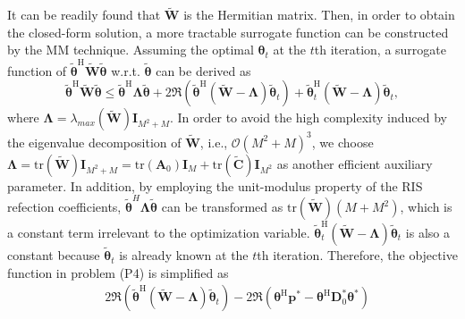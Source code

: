 \documentclass[journal]{IEEEtran}
\begin{document}
{It can be readily found that $\tilde{ \mathbf {W}}$ is the Hermitian matrix. Then, in order to obtain the closed-form solution, a more tractable surrogate function can be constructed by the MM technique. 
Assuming the optimal $\boldsymbol{\theta}_{t}$ at the $t$th iteration, a surrogate function of $\tilde{ \boldsymbol {\theta}}^{\mathrm{H}} \tilde{ \mathbf {W}} \tilde { \boldsymbol {\theta}}$ w.r.t. $\tilde{\boldsymbol {\theta}}$
can be derived as \cite{7547360}
\begin{equation}\!\! \tilde{ \boldsymbol {\theta}}^{\mathrm{H}} \!\tilde{ \mathbf {W}}\! \tilde { \boldsymbol {\theta}}\!\leq \!\tilde{\boldsymbol {\theta}}^{\mathrm{H}}\!{\boldsymbol {\Lambda}}\tilde{\boldsymbol {\theta}}\!+\!2{\Re}\left(\tilde{\boldsymbol {\theta}}^{\mathrm{H}}\left(\tilde{ \mathbf {W}}\! -\!{\boldsymbol {\Lambda}}\right)\tilde{\boldsymbol {\theta}}_{t}\right)\!\!+\!\tilde{\boldsymbol {\theta}}_{t}^{\mathrm{H}}\left(\tilde{ \mathbf {W}} \!\!-\!\!{\boldsymbol {\Lambda}}\right){\tilde{\boldsymbol {\theta}}}_{t},\end{equation}
where $\boldsymbol {\Lambda}= {\lambda}_{ {max}}(\tilde{ \mathbf {W}}){\mathbf{I}}_{{M}^{2}+{M}}$. In order to avoid the high complexity induced by the eigenvalue decomposition of $\tilde{ \mathbf {W}}$, i.e., $\mathcal {O}({M}^{2}+{M})^{3}$, we choose $\boldsymbol {\Lambda}={\mathrm {tr}}(\tilde{ \mathbf {W}}){\mathbf{I}}_{{M}^{2}+{M}}={\mathrm {tr}}(\mathbf{A}_{0}){\mathbf{I}}_{{M}}+{\mathrm {tr}}(\tilde{\mathbf{C}}){\mathbf{I}}_{{M}^{2}}$ as another efficient auxiliary parameter. In addition, by employing the unit-modulus property of the RIS refection coefficients,  $\tilde{\boldsymbol {\theta}}^{H}{\boldsymbol {\Lambda}}\tilde{\boldsymbol {\theta}}$ can be transformed as ${\mathrm {tr}}(\tilde{ \mathbf {W}})({M}+{M}^{2})$, which is a constant term irrelevant to the optimization variable.  
 $\tilde{\boldsymbol {\theta}}_{t}^{\mathrm{H}}\left(\tilde{ \mathbf {W}} -{\boldsymbol {\Lambda}}\right){\tilde{\boldsymbol {\theta}}}_{t}$ is also a constant because ${\tilde{\boldsymbol {\theta}}}_{t}$ is already known at the ${t}$th iteration.
Therefore, the objective function in problem (P4) is simplified as 
\begin{equation}\begin{aligned}&
2{\Re}\left(\tilde{\boldsymbol {\theta}}^{\mathrm{H}}\left(\tilde{ \mathbf {W}} -{\boldsymbol {\Lambda}}\right)\tilde{\boldsymbol {\theta}}_{t}\right) -2{\Re}(\boldsymbol {\theta }^{\mathrm{H}}\mathbf{p}^{\ast}-\boldsymbol {\theta}^{\mathrm{H}} \mathbf {D}_{0}^{\ast} \boldsymbol {\theta}^{\ast})

\end{aligned}
\end{equation}}
\end{document}
